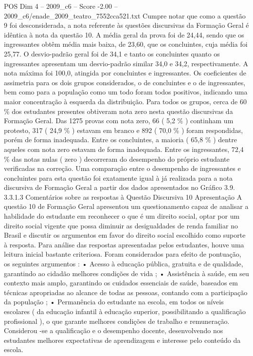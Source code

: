 \begin{textsample}{POS Dim 4 – 2009\_c6 – Score -2.00 – 2009\_c6/enade\_2009\_teatro\_7552cca521.txt}
Cumpre notar que como a questão 9 foi desconsiderada, a nota referente às questões discursivas da Formação Geral é idêntica à nota da questão 10.
A média geral da prova foi de 24,44, sendo que os ingressantes obtêm média mais baixa, de 23,60, que os concluintes, cuja média foi 25,77.
O desvio-padrão geral foi de 34,1 e tanto os concluintes quanto os ingressantes apresentam um desvio-padrão similar 34,0 e 34,2, respectivamente.
A nota máxima foi 100,0, atingida por concluintes e ingressantes.
Os coeficientes de assimetria para os dois grupos considerados, o de concluintes e o de ingressantes, bem como para a população como um todo foram todos positivos, indicando uma maior concentração à esquerda da distribuição.
Para todos os grupos, cerca de 60 \% dos estudantes presentes obtiveram nota zero nesta questão discursivas da Formação Geral.
Das 1275 provas com nota zero, 66 ( 5,2 \% ) continham um protesto, 317 ( 24,9 \% ) estavam em branco e 892 ( 70,0 \% ) foram respondidas, porém de forma inadequada.
Entre os concluintes, a maioria ( 65,8 \% ) dentre aqueles com nota zero estavam de forma inadequada.
Entre os ingressantes, 72,4 \% das notas nulas ( zero ) decorreram do desempenho do próprio estudante verificadas na correção.
Uma comparação entre o desempenho de ingressantes e concluintes para esta questão foi exatamente igual à já realizada para a nota discursiva de Formação Geral a partir dos dados apresentados no Gráfico 3.9. 3.3.1.3 Comentários sobre as respostas à Questão Discursiva 10 Apresentação A questão 10 de Formação Geral apresentou um questionamento capaz de analisar a habilidade do estudante em reconhecer o que é um direito social, optar por um direito social vigente que possa diminuir as desigualdades de renda familiar no Brasil e discutir os argumentos em favor do direito social escolhido como suporte à resposta.
Para análise das respostas apresentadas pelos estudantes, houve uma leitura inicial bastante criteriosa.
Foram considerados para efeito de pontuação, os seguintes argumentos : • Acesso à educação pública, gratuita e de qualidade, garantindo ao cidadão melhores condições de vida ; • Assistência à saúde, em seu contexto mais amplo, garantindo os cuidados essenciais de saúde, baseados em técnicas apropriadas ao alcance de todas as pessoas, contando com a participação da população ; • Permanência do estudante na escola, em todos os níveis escolares ( da educação infantil à educação superior, possibilitando a qualificação profissional ), o que garante melhores condições de trabalho e remuneração.
Considerou -se a qualificação e o desempenho docente, desenvolvendo nos estudantes melhores expectativas de aprendizagem e interesse pelo conteúdo da escola.

\end{textsample}
